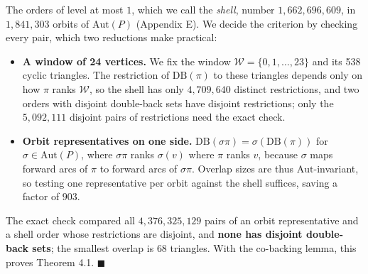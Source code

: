 \documentclass[
]{article}
\newcounter{none} %
\providecommand{\tightlist}{%
  \setlength{\itemsep}{0pt}\setlength{\parskip}{0pt}}
\begin{document}
The orders of level at most \(1\), which we call the \emph{shell},
number \(1{,}662{,}696{,}609\), in \(1{,}841{,}303\) orbits of
\(\mathrm{Aut}(P)\) (Appendix E). We decide the criterion by checking
every pair, which two reductions make practical:

\begin{itemize}
\tightlist
\item
  \textbf{A window of 24 vertices.} We fix the window
  \(\mathcal{W} = \{0, 1, \dots, 23\}\) and its 538 cyclic triangles.
  The restriction of \(\mathrm{DB}(\pi)\) to these triangles depends
  only on how \(\pi\) ranks \(\mathcal{W}\), so the shell has only
  \(4{,}709{,}640\) distinct restrictions, and two orders with disjoint
  double-back sets have disjoint restrictions; only the
  \(5{,}092{,}111\) disjoint pairs of restrictions need the exact check.
\item
  \textbf{Orbit representatives on one side.}
  \(\mathrm{DB}(\sigma \pi) = \sigma(\mathrm{DB}(\pi))\) for
  \(\sigma \in \mathrm{Aut}(P)\), where \(\sigma \pi\) ranks
  \(\sigma(v)\) where \(\pi\) ranks \(v\), because \(\sigma\) maps
  forward arcs of \(\pi\) to forward arcs of \(\sigma \pi\). Overlap
  sizes are thus \(\mathrm{Aut}\)-invariant, so testing one
  representative per orbit against the shell suffices, saving a factor
  of \(903\).
\end{itemize}

The exact check compared all \(4{,}376{,}325{,}129\) pairs of an orbit
representative and a shell order whose restrictions are disjoint, and
\textbf{none has disjoint double-back sets}; the smallest overlap is
\(68\) triangles. With the co-backing lemma, this proves Theorem 4.1.
\(\blacksquare\)
\end{document}
